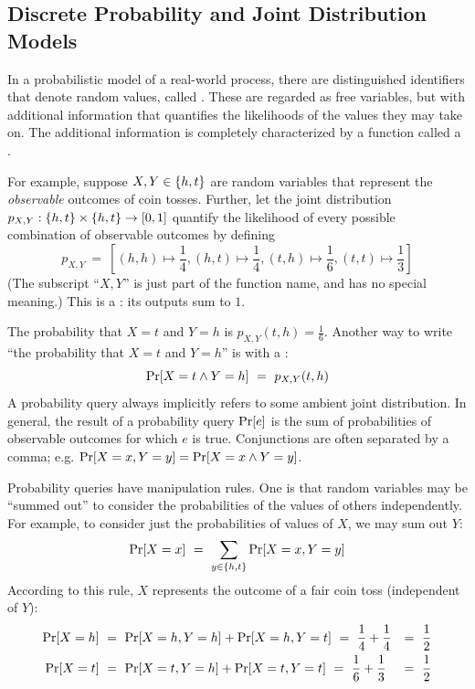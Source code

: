 \subsection{Discrete Probability and Joint Distribution Models}

In a probabilistic model of a real-world process, there are distinguished identifiers that denote random values, called .
These are regarded as free variables, but with additional information that quantifies the likelihoods of the values they may take on.
The additional information is completely characterized by a function called a .

For example, suppose $X,Y \in \{{h,t}\}$ are random variables that represent the \emph{observable} outcomes of coin tosses.
Further, let the joint distribution $p_{X,Y} : \{{h,t}\} \times \{{h,t}\} \to [0,1]$ quantify the likelihood of every possible combination of observable outcomes by defining
\begin{equation}
	p_{X,Y}\ =\ \left[(h,h) \mapsto \frac{1}{4},
		(h,t) \mapsto \frac{1}{4},
		(t,h) \mapsto \frac{1}{6},
		(t,t) \mapsto \frac{1}{3}\right]
\end{equation}
(The subscript ``$X,Y$'' is just part of the function name, and has no special meaning.)
This is a : its outputs sum to $1$.

The probability that $X = t$ and $Y = h$ is $p_{X,Y}(t,h) = \frac{1}{6}$.
Another way to write ``the probability that $X = t$ and $Y = h$'' is with a :
\begin{equation}
	\Pspec{X = t \band Y = h}\ =\ p_{X,Y}(t,h)
\end{equation}
A probability query always implicitly refers to some ambient joint distribution.
In general, the result of a probability query $\mathrm{Pr}\!\left[{e}\right]$ is the sum of probabilities of observable outcomes for which $e$ is true.
Conjunctions are often separated by a comma; e.g. $\mathrm{Pr}\!\left[{X = x, Y = y}\right] = \mathrm{Pr}\!\left[{X = x \wedge Y = y}\right]$.

Probability queries have manipulation rules.
One is that random variables may be ``summed out'' to consider the probabilities of the values of others independently.
For example, to consider just the probabilities of values of $X$, we may sum out $Y$:
\begin{equation}
	\mathrm{Pr}\!\left[{X = x}\right]\ =\ \sum_{y \in \{{h,t}\}} \mathrm{Pr}\!\left[{X = x, Y = y}\right]
\end{equation}
According to this rule, $X$ represents the outcome of a fair coin toss (independent of $Y$):
\begin{equation}
\begin{aligned}
	\Pspec{X = h}&\ =\ \Pspec{X = h, Y = h} + \Pspec{X = h, Y = t}\ =\ \frac{1}{4} + \frac{1}{4}&=\ \frac{1}{2}
\\
	\Pspec{X = t}&\ =\ \Pspec{X = t, Y = h} + \Pspec{X = t, Y = t}\ =\ \frac{1}{6} + \frac{1}{3}&=\ \frac{1}{2}
\end{aligned}
\end{equation}

